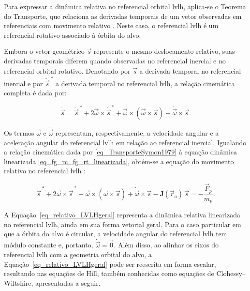 
Para expressar a dinâmica relativa no referencial orbital \gls{lvlh}, aplica-se o Teorema do Transporte, que relaciona as derivadas temporais de um vetor observadas em referenciais com movimento relativo \cite{wie2008space, symon1979}. Neste caso, o referencial \gls{lvlh} é um referencial rotativo associado à órbita do alvo.

Embora o vetor geométrico $\vec{s}$ represente o mesmo deslocamento relativo, suas derivadas temporais diferem quando observadas no referencial inercial e no referencial orbital rotativo. Denotando por $\ddot{\vec{s}}$ a derivada temporal no referencial inercial e por $\ddot{\vec{s}}^{\,*}$ a derivada temporal no referencial \gls{lvlh}, a relação cinemática completa é dada por:

\begin{equation}
\label{eq_TransporteSymon1979}
\ddot{\vec s} = 
\ddot{\vec s}^{\,*}
+ 2 \vec{\omega} \times \dot{\vec s}^{\,*}
+ \vec{\omega} \times (\vec \omega \times \vec {s})
+ \dot{\vec{\omega}} \times \vec{s}.
\end{equation}

Os termos $\vec{\omega}$ e $\dot{\vec{\omega}}$ representam, respectivamente, a velocidade angular e a aceleração angular do referencial \gls{lvlh} em relação ao referencial inercial.
Igualando a relação cinemática dada por \eqref{eq_TransporteSymon1979} à equação dinâmica linearizada \eqref{eq_fg_rc_fg_rt_linearizada}, obtém-se a equação do movimento relativo no referencial \gls{lvlh} \cite{fehse2003}:

\begin{equation}
\label{eq_relativo_LVLHgeral}
\ddot{\vec s}^{\,*}
+ 2 \vec \omega \times \dot{\vec s}^{\,*} 
+ \vec \omega \times (\vec \omega \times \vec{s})
+ \dot{\vec \omega} \times \vec{s}
- \mathbf{J}(\vec r_a)\,\vec{s}
= - \frac{\vec{F}_p}{m_p}.
\end{equation}

A Equação~\eqref{eq_relativo_LVLHgeral} representa a dinâmica relativa linearizada no referencial \gls{lvlh}, ainda em sua forma vetorial geral.
Para o caso particular em que a órbita do alvo é circular, a velocidade angular do referencial \gls{lvlh} tem módulo constante e, portanto, $\dot{\vec{\omega}}=\vec{0}$. Além disso, ao alinhar os eixos do referencial \gls{lvlh} com a geometria orbital do alvo, a Equação~\eqref{eq_relativo_LVLHgeral} pode ser reescrita em forma escalar, resultando nas equações de Hill, também conhecidas como equações de Clohessy--Wiltshire, apresentadas a seguir.